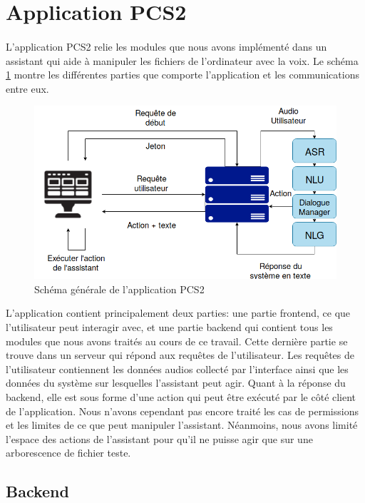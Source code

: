 \section{Application PCS2}
\paragraph{}L'application PCS2 relie les modules que nous avons implémenté dans un assistant qui aide à manipuler les fichiers de l'ordinateur avec la voix. Le schéma \ref{schema_app} montre les différentes parties que comporte l'application et les communications entre eux.
\begin{figure}[H] 
	\centering
	\includegraphics[width=0.95\linewidth]{images/Realisation/schema_app.png}
	\caption{Schéma générale de l'application PCS2}\label{schema_app}
\end{figure}
\par L'application contient principalement deux parties: une partie frontend, ce que l'utilisateur peut interagir avec, et une partie backend qui contient tous les modules que nous avons traités au cours de ce travail. Cette dernière partie se trouve dans un serveur qui répond aux requêtes de l'utilisateur. Les requêtes de l'utilisateur contiennent les données audios collecté par l'interface ainsi que les données du système sur lesquelles l'assistant peut agir. Quant à la réponse du backend, elle est sous forme d'une action qui peut être exécuté par le côté client de l'application. Nous n'avons cependant pas encore traité les cas de permissions et les limites de ce que peut manipuler l'assistant. Néanmoins, nous avons limité l'espace des actions de l'assistant pour qu'il ne puisse agir que sur une arborescence de fichier teste.
\subsection{Backend}
